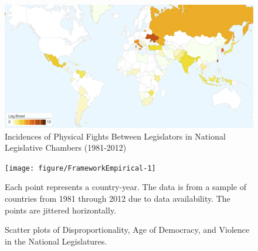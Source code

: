 \documentclass[a4paper]{article}\usepackage[]{graphicx}\usepackage[]{color}
\newenvironment{knitrout}{}{} %
\begin{document}
\clearpage

\begin{figure}[h!]
    \centering

        \includegraphics[width = 13cm]{incidence_map.png}

        \caption{Incidences of Physical Fights Between Legislators in National Legislative Chambers (1981-2012)}
        \label{leg_map}

\end{figure}

\begin{figure}[t]
    \begin{center}

\begin{knitrout}
\color{fgcolor}
\texttt{[image: figure/FrameworkEmpirical-1]} 

\end{knitrout}
    \end{center}

    \caption{Scatter plots of Disproportionality, Age of Democracy, and Violence in the National Legislatures.}
    \label{framework_empirical}

    \begin{singlespace}
        {\scriptsize{Each point represents a country-year. The data is from a sample of countries from 1981 through 2012 due to data availability. The points are jittered horizontally.}}
    \end{singlespace}

\end{figure}

\end{document}
